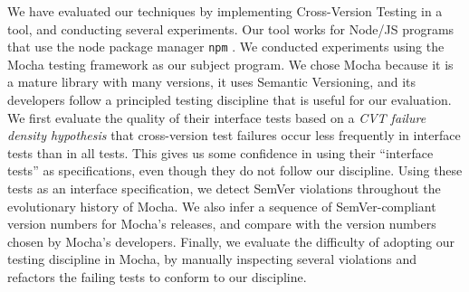 


We have evaluated our techniques by implementing Cross-Version Testing
in a tool, and conducting several experiments. 
%
Our tool works for Node/JS programs that use the node package manager
{\tt npm} .
%
We conducted experiments using the Mocha testing framework as our
subject program. We chose Mocha because it is a mature library with
many versions, it uses Semantic Versioning, and its developers follow
a principled testing discipline that is useful for our evaluation.
%
We first evaluate the quality of their interface tests based on a {\em
  CVT failure density hypothesis} that cross-version test failures
occur less frequently in interface tests than in all tests. This gives
us some confidence in using their ``interface tests'' as
specifications, even though they do not follow our discipline.
%
Using these tests as an interface specification, we detect SemVer
violations throughout the evolutionary history of Mocha.
%
We also infer a sequence of SemVer-compliant version numbers for
Mocha's releases, and compare with the version numbers chosen by
Mocha's developers.
%
Finally, we evaluate the difficulty of adopting our testing discipline
in Mocha, by manually inspecting several violations and refactors the
failing tests to conform to our discipline.

